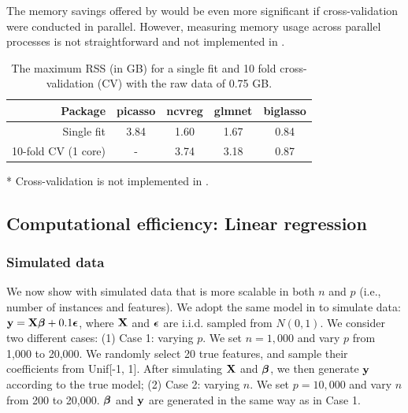 The memory savings offered by  would be even more significant if cross-validation were conducted in parallel. However, measuring memory usage across parallel processes is not straightforward and not implemented in .


\begin{table}[h] 
\centering
\begin{threeparttable}
\begin{tabular}{r|cccc}
\toprule
Package & picasso\tnote{*} & ncvreg & glmnet & biglasso \\
\midrule
Single fit & 3.84 & 1.60 & 1.67 & 0.84 \\
10-fold CV (1 core) &  - &  3.74 & 3.18  & 0.87 \\
\bottomrule
\end{tabular}
\begin{tablenotes}\footnotesize
\item[*] Cross-validation is not implemented in .
\end{tablenotes}
\end{threeparttable}
\caption{The maximum RSS (in GB) for a single fit and 10 fold cross-validation (CV) with the raw data of 0.75 GB.}
\label{tab_memo}
\end{table}


\subsection{Computational efficiency: Linear regression}

\subsubsection{Simulated data}

We now show with simulated data that  is more scalable in both $n$ and $p$ (i.e., number of instances and features). We adopt the same model in \cite{JMLR:v16:wang15a} to simulate data: $\mathbf{y} = \mathbf{X} \boldsymbol{\beta} + 0.1 \boldsymbol{\epsilon}$, where $\mathbf{X}$ and $\boldsymbol{\epsilon}$ are i.i.d. sampled from $N(0, 1)$. We consider two different cases: (1) Case 1: varying $p$. We set $n=1,000$ and vary $p$ from 1,000 to 20,000. We randomly select 20 true features, and sample their coefficients from Unif[-1, 1]. After simulating $\mathbf{X}$ and $\boldsymbol{\beta}$, we then generate $\mathbf{y}$ according to the true model; (2) Case 2: varying $n$. We set $p=10,000$ and vary $n$ from 200 to 20,000. $\boldsymbol{\beta}$ and $\mathbf{y}$ are generated in the same way as in Case 1.

